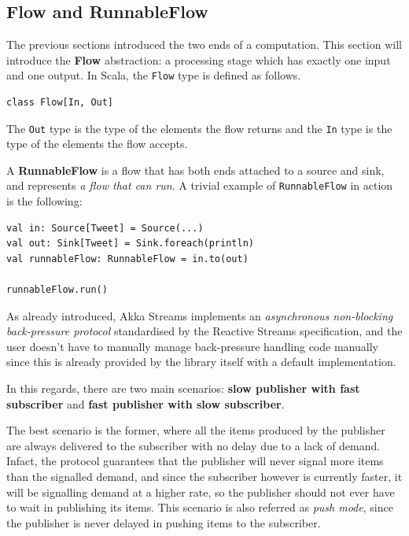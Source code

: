 \subsection{Flow and RunnableFlow}\label{flow-and-runnableflow}

The previous sections introduced the two ends of a computation. This
section will introduce the \textbf{Flow} abstraction: a processing stage
which has exactly one input and one output. In Scala, the \texttt{Flow}
type is defined as follows.

\begin{verbatim}
class Flow[In, Out]
\end{verbatim}

The \texttt{Out} type is the type of the elements the flow returns and
the \texttt{In} type is the type of the elements the flow accepts.

A \textbf{RunnableFlow} is a flow that has both ends attached to a
source and sink, and represents \emph{a flow that can run}. A trivial
example of \texttt{RunnableFlow} in action is the following:

\begin{verbatim}
val in: Source[Tweet] = Source(...)
val out: Sink[Tweet] = Sink.foreach(println)
val runnableFlow: RunnableFlow = in.to(out)

runnableFlow.run()
\end{verbatim}

As already introduced, Akka Streams implements an \emph{asynchronous
non-blocking back-pressure protocol} standardised by the Reactive
Streams specification, and the user doesn't have to manually manage
back-pressure handling code manually since this is already provided by
the library itself with a default implementation.

In this regards, there are two main scenarios: \textbf{slow publisher
with fast subscriber} and \textbf{fast publisher with slow subscriber}.

The best scenario is the former, where all the items produced by the
publisher are always delivered to the subscriber with no delay due to a
lack of demand. Infact, the protocol guarantees that the publisher will
never signal more items than the signalled demand, and since the
subscriber however is currently faster, it will be signalling demand at
a higher rate, so the publisher should not ever have to wait in
publishing its items. This scenario is also referred as \emph{push
mode}, since the publisher is never delayed in pushing items to the
subscriber.

